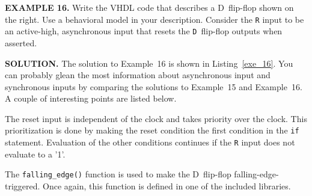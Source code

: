 \begin{leftbar}
\begin{minipage}{0.5\linewidth}
\noindent
\textbf{EXAMPLE 16.}
Write the VHDL code that describes a D~flip-flop shown on the right. Use a behavioral model in your description. Consider the \texttt{R} input to be an active-high, asynchronous input that resets the \texttt{D}~flip-flop outputs when asserted.
\end{minipage}
\begin{minipage}{0.47\linewidth}
\begin{flushright}
\end{flushright}
\end{minipage}
\end{leftbar}
\noindent
\textbf{SOLUTION.} The solution to Example~16 is shown in Listing~\ref{exe_16}. You can probably glean the most information about asynchronous input and synchronous inputs by comparing the solutions to Example~15 and Example~16. A couple of interesting points are listed below. 
\begin{my_list}
\item The reset input is independent of the clock and takes priority over the clock. This prioritization is done by making the reset condition the first condition in the \texttt{if} statement. Evaluation of the other conditions continues if the \texttt{R} input does not evaluate to a '1'.
\item The \texttt{falling\_edge()} function is used to make the D~flip-flop falling-edge-triggered. Once again, this function is defined in one of the included libraries. 
\end{my_list}

